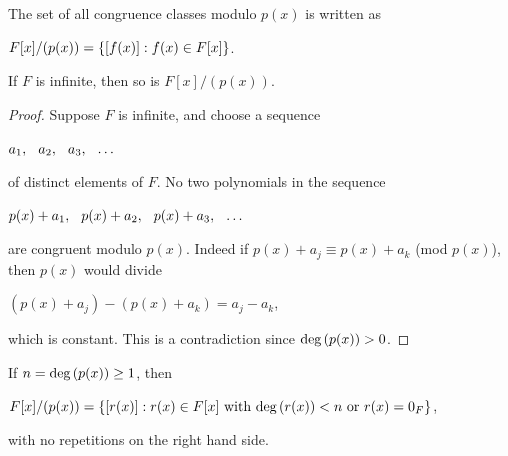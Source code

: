 \documentclass[11pt,fleqn,dvipsnames,usenames]{article}
\begin{document}
\notation The set of all congruence classes modulo $p(x)$ is written as
\begin{center}
$F[x]/(p(x)) = \left\{[f(x)]:f(x)\in F[x]\right\}$.
\end{center} 
\vsp

%
\begin{theorem}
If $F$ is infinite, then so is $F[x]/(p(x))$.
\end{theorem}
%
\begin{proof}
Suppose $F$ is infinite, and choose a sequence
\begin{center}
$a_{1},\hspace{0.25cm} a_{2},\hspace{0.25cm} a_{3},\hspace{0.25cm} \ldots$
\end{center}
of distinct elements of $F$.  No two polynomials in the sequence
\begin{center}
$p(x) + a_{1},\hspace{0.25cm} p(x) + a_{2},\hspace{0.25cm} p(x) + a_{3},\hspace{0.25cm} \ldots$
\end{center}
are congruent modulo $p(x)$.  Indeed if $p(x) + a_{j}\equiv p(x) + a_{k}$ (mod $p(x)$), then $p(x)$ would divide
\begin{center}
$(p(x) + a_{j}) - (p(x) + a_{k}) = a_{j} - a_{k}$,
\end{center}
which is constant.  This is a contradiction since $\text{deg}\left(p(x)\right)>0$.
\end{proof}
%
\begin{theorem}\label{representationsofFofxmodpofx}
If $n = \text{deg}\left(p(x)\right)\geq 1$, then
\begin{center}
$F[x]/(p(x)) = \left\{[r(x)]: r(x)\in F[x]\text{ with }\text{deg}\left(r(x)\right) < n\text{ or }r(x) = 0_{F}\right\}$,
\end{center}
with no repetitions on the right hand side.
\end{theorem}
%
\end{document}
